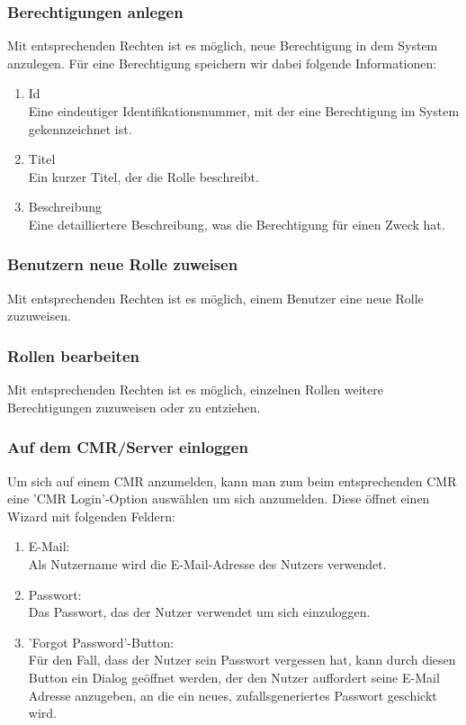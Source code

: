 \documentclass[titlepage]{article}
\begin{document}
\subsubsection{Berechtigungen anlegen}

Mit entsprechenden Rechten ist es möglich, neue Berechtigung in dem System anzulegen. Für eine Berechtigung speichern wir dabei folgende Informationen:
\begin{enumerate}
	\item Id\\
	Eine eindeutiger Identifikationsnummer, mit der eine Berechtigung im System gekennzeichnet ist.
	\item Titel\\
	Ein kurzer Titel, der die Rolle beschreibt.
	\item Beschreibung\\
	Eine detailliertere Beschreibung, was die Berechtigung für einen Zweck hat.
\end{enumerate}

\subsubsection{Benutzern neue Rolle zuweisen}

Mit entsprechenden Rechten ist es möglich, einem Benutzer eine neue Rolle zuzuweisen.

\subsubsection{Rollen bearbeiten}

Mit entsprechenden Rechten ist es möglich, einzelnen Rollen weitere Berechtigungen zuzuweisen oder zu entziehen.


\subsubsection{Auf dem CMR/Server einloggen}
Um sich auf einem CMR anzumelden, kann man zum beim entsprechenden CMR eine 'CMR Login'-Option auswählen um sich anzumelden. Diese öffnet einen Wizard mit folgenden Feldern:
\begin{enumerate}
	\item E-Mail:\\
	Als Nutzername wird die E-Mail-Adresse des Nutzers verwendet.
	\item Passwort:\\
	Das Passwort, das der Nutzer verwendet um sich einzuloggen.
	\item 'Forgot Password'-Button:\\
	Für den Fall, dass der Nutzer sein Passwort vergessen hat, kann durch diesen Button ein Dialog geöffnet werden, der den Nutzer auffordert seine E-Mail Adresse anzugeben, an die ein neues, zufallsgeneriertes Passwort geschickt wird.
\end{enumerate}
\end{document}
